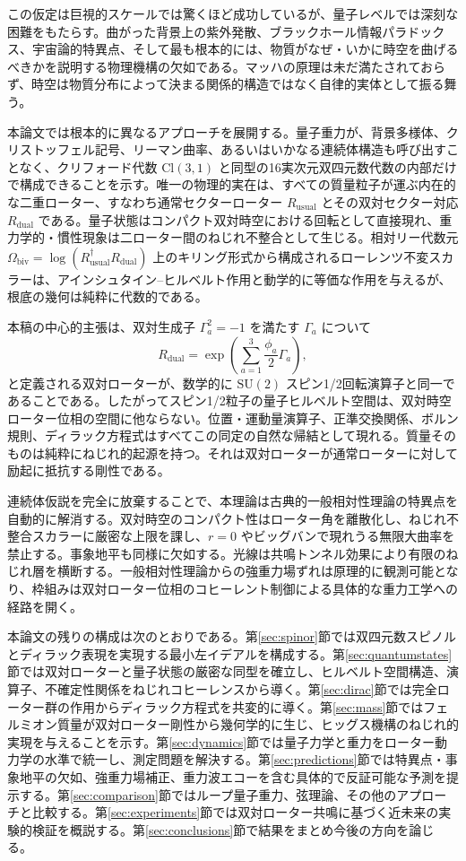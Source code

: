 \documentclass[a4paper]{article}
\begin{document}
この仮定は巨視的スケールでは驚くほど成功しているが、量子レベルでは深刻な困難をもたらす。曲がった背景上の紫外発散、ブラックホール情報パラドックス、宇宙論的特異点、そして最も根本的には、物質がなぜ・いかに時空を曲げるべきかを説明する物理機構の欠如である。マッハの原理は未だ満たされておらず、時空は物質分布によって決まる関係的構造ではなく自律的実体として振る舞う。

本論文では根本的に異なるアプローチを展開する。量子重力が、背景多様体、クリストッフェル記号、リーマン曲率、あるいはいかなる連続体構造も呼び出すことなく、クリフォード代数 $\mathrm{Cl}(3,1)$ と同型の16実次元双四元数代数の内部だけで構成できることを示す。唯一の物理的実在は、すべての質量粒子が運ぶ内在的な二重ローター、すなわち通常セクターローター $R_\text{usual}$ とその双対セクター対応 $R_\text{dual}$ である。量子状態はコンパクト双対時空における回転として直接現れ、重力学的・慣性現象は二ローター間のねじれ不整合として生じる。相対リー代数元 $\Omega_\text{biv} = \log(R_\text{usual}^\dagger R_\text{dual})$ 上のキリング形式から構成されるローレンツ不変スカラーは、アインシュタイン--ヒルベルト作用と動学的に等価な作用を与えるが、根底の幾何は純粋に代数的である。

本稿の中心的主張は、双対生成子 $\Gamma_a^2 = -1$ を満たす $\Gamma_a$ について
\[
R_\text{dual} = \exp\left( \sum_{a=1}^3 \frac{\phi_a}{2} \Gamma_a \right),
\]
と定義される双対ローターが、数学的に $\mathrm{SU}(2)$ スピン1/2回転演算子と同一であることである。したがってスピン1/2粒子の量子ヒルベルト空間は、双対時空ローター位相の空間に他ならない。位置・運動量演算子、正準交換関係、ボルン規則、ディラック方程式はすべてこの同定の自然な帰結として現れる。質量そのものは純粋にねじれ的起源を持つ。それは双対ローターが通常ローターに対して励起に抵抗する剛性である。

連続体仮説を完全に放棄することで、本理論は古典的一般相対性理論の特異点を自動的に解消する。双対時空のコンパクト性はローター角を離散化し、ねじれ不整合スカラーに厳密な上限を課し、$r=0$ やビッグバンで現れうる無限大曲率を禁止する。事象地平も同様に欠如する。光線は共鳴トンネル効果により有限のねじれ層を横断する。一般相対性理論からの強重力場ずれは原理的に観測可能となり、枠組みは双対ローター位相のコヒーレント制御による具体的な重力工学への経路を開く。

本論文の残りの構成は次のとおりである。第\ref{sec:spinor}節では双四元数スピノルとディラック表現を実現する最小左イデアルを構成する。第\ref{sec:quantumstates}節では双対ローターと量子状態の厳密な同型を確立し、ヒルベルト空間構造、演算子、不確定性関係をねじれコヒーレンスから導く。第\ref{sec:dirac}節では完全ローター群の作用からディラック方程式を共変的に導く。第\ref{sec:mass}節ではフェルミオン質量が双対ローター剛性から幾何学的に生じ、ヒッグス機構のねじれ的実現を与えることを示す。第\ref{sec:dynamics}節では量子力学と重力をローター動力学の水準で統一し、測定問題を解決する。第\ref{sec:predictions}節では特異点・事象地平の欠如、強重力場補正、重力波エコーを含む具体的で反証可能な予測を提示する。第\ref{sec:comparison}節ではループ量子重力、弦理論、その他のアプローチと比較する。第\ref{sec:experiments}節では双対ローター共鳴に基づく近未来の実験的検証を概説する。第\ref{sec:conclusions}節で結果をまとめ今後の方向を論じる。
\end{document}
